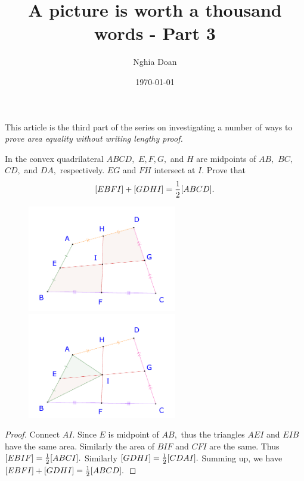 \documentclass{article}
\title{A picture is worth a thousand words - Part 3}
\author{Nghia Doan}
\date{\today}
\begin{document}
\maketitle

This article is the third part of the series on investigating a number of ways to \textit{prove area equality without writing lengthy proof.}

\begin{example*}[Example 11]
    In the convex quadrilateral $ABCD,$ $E, F, G,$ and $H$ are midpoints of $AB,$ $BC,$ $CD,$ and $DA,$ respectively.
    $EG$ and $FH$ intersect at $I$.
    Prove that
    \[
        [EBFI] + [GDHI] = \frac{1}{2} [ABCD].
    \]
\end{example*}

\begin{figure}[h]
    \centering
    \begin{minipage}[t]{6.5cm}
        \begin{center}
            \includegraphics[width=6.5cm]{./svg/pdf/23-24-s3-i-p12.pdf}
        \end{center}
    \end{minipage}
    \qquad
    \begin{minipage}[t]{6.5cm}
        \centering
        \begin{center}
            \includegraphics[width=6.5cm]{./svg/pdf/23-24-s3-i-p12-s.pdf}
        \end{center}
    \end{minipage}
\end{figure}

\begin{proof}
    Connect $AI.$ Since $E$ is midpoint of $AB,$ thus the triangles $AEI$ and $EIB$ have the same area.
    Similarly the area of $BIF$ and $CFI$ are the same. Thus $[EBIF] = \frac{1}{2} [ABCI].$
    Similarly $[GDHI] = \frac{1}{2} [CDAI].$
    Summing up, we have $[EBFI] + [GDHI] = \frac{1}{2} [ABCD].$
\end{proof}
\end{document}
